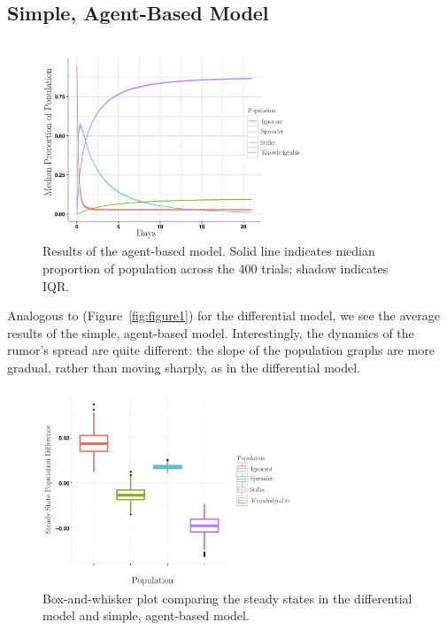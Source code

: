 \subsection{Simple, Agent-Based Model}

\begin{figure}[H]
\captionsetup{width=0.8\textwidth}
\centering
    \includegraphics[width=0.7\textwidth]{figures/figure5}
  \caption{Results of the agent-based model.
Solid line indicates median proportion of population across the 400 trials; shadow indicates IQR.}
\label{fig:figure5}
\end{figure}

Analogous to (Figure~\ref{fig:figure1}) for the differential model, we see the average results of the simple, agent-based model.
Interestingly, the dynamics of the rumor's spread are quite different: the slope of the population graphs are more gradual, rather than moving sharply, as in the differential model.

\begin{figure}[H]
\captionsetup{width=0.8\textwidth}
\centering
    \includegraphics[width=0.7\textwidth]{figures/figure6}
  \caption{Box-and-whisker plot comparing the steady states in the differential model and simple, agent-based model.}
\label{fig:figure6}
\end{figure}

